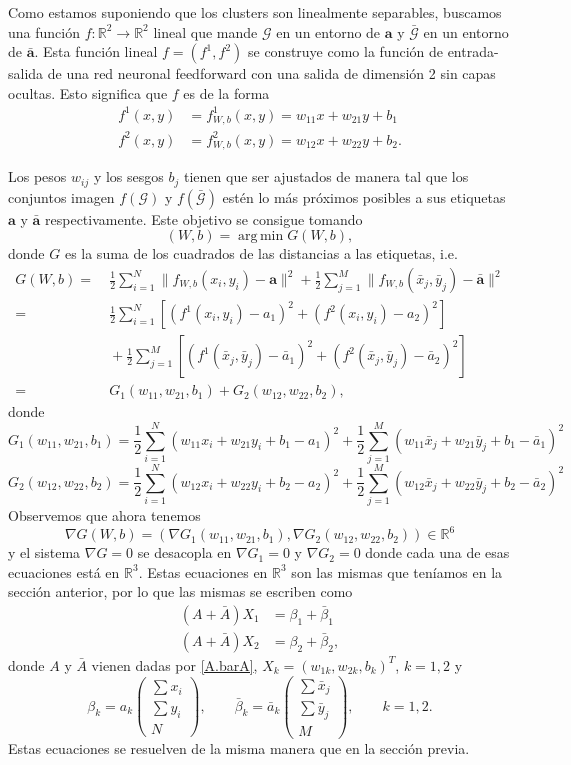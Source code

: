 \documentclass[12pt, a4paper]{amsbook}
\def\argmin{\operatorname {\mathrm{arg\, min}}}
\newcommand{\R}{{\mathbb R}}
\newcommand{\G}{{\mathcal G}}
\newcommand{\ab}{{\mathbf a}}
\theoremstyle{remark}
\theoremstyle{definition}
\numberwithin{section}{chapter}
\numberwithin{subsection}{section}
\numberwithin{equation}{section}
\numberwithin{figure}{chapter}
\begin{document}
Como estamos suponiendo que los clusters son linealmente separables, buscamos una función $f\colon \R^2\to\R^2$ lineal que mande $\G$ en un entorno de $\ab$ y $\bar\G$ en un entorno de $\bar\ab$. Esta función lineal $f=(f^1, f^2)$ se construye como la función de entrada-salida de una red neuronal feedforward con una salida de dimensión 2 sin capas ocultas. Esto significa que $f$ es de la forma
\begin{align*}
f^1(x, y) &= f^1_{W, b}(x, y) = w_{11}x + w_{21}y + b_1\\
f^2(x, y) &= f^2_{W, b}(x, y) = w_{12}x + w_{22}y + b_2.
\end{align*}

Los pesos $w_{ij}$ y los sesgos $b_j$ tienen que ser ajustados de manera tal que los conjuntos imagen $f(\G)$ y $f(\bar\G)$ estén lo más próximos posibles a sus etiquetas $\ab$ y $\bar\ab$ respectivamente. Este objetivo se consigue tomando
$$
(W, b) = \argmin G(W, b),
$$
donde $G$ es la suma de los cuadrados de las distancias a las etiquetas, i.e.
\begin{align*}
G(W, b) = &\ \frac12 \sum_{i=1}^N \|f_{W, b}(x_i, y_i) - \ab\|^2 + \frac12 \sum_{j=1}^M \|f_{W, b}(\bar x_j, \bar y_j) - \bar \ab\|^2\\
= &\ \frac12 \sum_{i=1}^N \left[(f^1(x_i, y_i)-a_1)^2 + (f^2(x_i, y_i)-a_2)^2\right]\\
&\ +\frac12 \sum_{j=1}^M \left[(f^1(\bar x_j, \bar y_j)-\bar a_1)^2 + (f^2(\bar x_j, \bar y_j)-\bar a_2)^2\right]\\
= &\ G_1(w_{11}, w_{21}, b_1) + G_2(w_{12}, w_{22}, b_2),
\end{align*}
donde
$$
G_1(w_{11}, w_{21}, b_1) = \frac12 \sum_{i=1}^N (w_{11} x_i+w_{21} y_i + b_1 - a_1)^2 + \frac12\sum_{j=1}^M (w_{11} \bar x_j + w_{21} \bar y_j + b_1 - \bar a_1)^2
$$
$$
G_2(w_{12}, w_{22}, b_2) = \frac12 \sum_{i=1}^N (w_{12} x_i+w_{22} y_i + b_2 - a_2)^2 + \frac12\sum_{j=1}^M (w_{12} \bar x_j + w_{22} \bar y_j + b_2 - \bar a_2)^2
$$
Observemos que ahora tenemos
$$
\nabla G(W, b) = (\nabla G_1(w_{11}, w_{21}, b_1),\nabla G_2(w_{12}, w_{22}, b_2))\in \R^6
$$
y el sistema $\nabla G=0$ se desacopla en $\nabla G_1=0$ y $\nabla G_2=0$ donde cada una de esas ecuaciones está en $\R^3$. Estas ecuaciones en $\R^3$ son las mismas que teníamos en la sección anterior, por lo que las mismas se escriben como
\begin{align*}
(A+\bar A) X_1 &= \beta_1 + \bar\beta_1\\
(A+\bar A) X_2 &= \beta_2 + \bar\beta_2,
\end{align*}
donde $A$ y $\bar A$ vienen dadas por \eqref{A.barA}, $X_k = (w_{1k}, w_{2k}, b_k)^T$, $k=1, 2$ y 
$$
\beta_k = a_k \begin{pmatrix}
\sum x_i\\ 
\sum y_i\\
N
\end{pmatrix},\qquad
\bar\beta_k = \bar a_k\begin{pmatrix}
\sum \bar x_j\\ 
\sum \bar y_j\\
M
\end{pmatrix}, \qquad k=1, 2.
$$
Estas ecuaciones se resuelven de la misma manera que en la sección previa.
\end{document}
